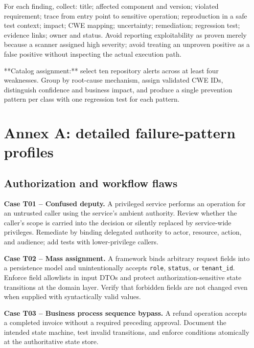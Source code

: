 \documentclass[
  letterpaper,
]{article}
\begin{document}
For each finding, collect: title; affected component and version;
violated requirement; trace from entry point to sensitive operation;
reproduction in a safe test context; impact; CWE mapping; uncertainty;
remediation; regression test; evidence links; owner and status. Avoid
reporting exploitability as proven merely because a scanner assigned
high severity; avoid treating an unproven positive as a false positive
without inspecting the actual execution path.

\begin{fieldwork}
**Catalog assignment:** select ten repository alerts across at least four weaknesses. Group by root-cause mechanism, assign validated CWE IDs, distinguish confidence and business impact, and produce a single prevention pattern per class with one regression test for each pattern.
\end{fieldwork}

\section{Annex A: detailed failure-pattern
profiles}\label{annex-a-detailed-failure-pattern-profiles}

\subsection{Authorization and workflow
flaws}\label{authorization-and-workflow-flaws}

\textbf{Case T01 -- Confused deputy.} A privileged service performs an
operation for an untrusted caller using the service's ambient authority.
Review whether the caller's scope is carried into the decision or
silently replaced by service-wide privileges. Remediate by binding
delegated authority to actor, resource, action, and audience; add tests
with lower-privilege callers.

\textbf{Case T02 -- Mass assignment.} A framework binds arbitrary
request fields into a persistence model and unintentionally accepts
\texttt{role}, \texttt{status}, or \texttt{tenant\_id}. Enforce field
allowlists in input DTOs and protect authorization-sensitive state
transitions at the domain layer. Verify that forbidden fields are not
changed even when supplied with syntactically valid values.

\textbf{Case T03 -- Business process sequence bypass.} A refund
operation accepts a completed invoice without a required preceding
approval. Document the intended state machine, test invalid transitions,
and enforce conditions atomically at the authoritative state store.
\end{document}
